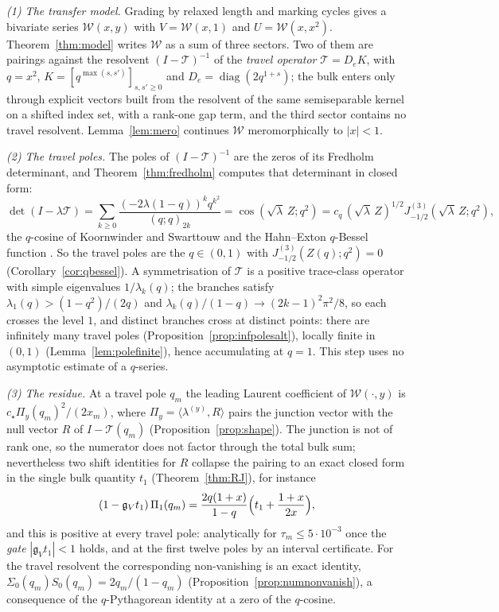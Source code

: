 \documentclass[11pt]{article}
\theoremstyle{plain}
\theoremstyle{definition}
\theoremstyle{remark}
\theoremstyle{plain}\newtheorem*{maintheorem}{Main Theorem}
\begin{document}
\emph{(1) The transfer model.} Grading by relaxed length and marking cycles gives a bivariate
series $\mathcal W(x,y)$ with $V=\mathcal W(x,1)$ and $U=\mathcal W(x,x^2)$. Theorem~\ref{thm:model}
writes $\mathcal W$ as a sum of three sectors. Two of them are pairings against the resolvent
$(I-\mathcal T)^{-1}$ of the \emph{travel operator} $\mathcal T=D_eK$, with $q=x^2$,
$K=[q^{\max(s,s')}]_{s,s'\ge0}$ and $D_e=\operatorname{diag}(2q^{1+s})$; the bulk enters only
through explicit vectors built from the resolvent of the same semiseparable kernel on a shifted
index set, with a rank-one gap term, and the third sector contains no travel resolvent.
Lemma~\ref{lem:mero} continues $\mathcal W$ meromorphically to $|x|<1$.

\emph{(2) The travel poles.} The poles of $(I-\mathcal T)^{-1}$ are the zeros of its Fredholm
determinant, and Theorem~\ref{thm:fredholm} computes that determinant in closed form:
\[
   \det(I-\lambda\mathcal T)=\sum_{k\ge0}\frac{(-2\lambda(1-q))^kq^{k^2}}{(q;q)_{2k}}
   =\cos(\sqrt\lambda\,Z;q^2)=c_q\,(\sqrt\lambda\,Z)^{1/2}J^{(3)}_{-1/2}(\sqrt\lambda\,Z;q^2),
\]
the $q$-cosine of Koornwinder and Swarttouw \cite{KS1992} and the Hahn--Exton $q$-Bessel
function \cite{Hahn1953,Exton1978,KoelinkSwarttouw1994}. So the travel poles are the $q\in(0,1)$
with $J^{(3)}_{-1/2}(Z(q);q^2)=0$ (Corollary~\ref{cor:qbessel}). A symmetrisation of $\mathcal T$ is
a positive trace-class operator with simple eigenvalues $1/\lambda_k(q)$; the branches satisfy
$\lambda_1(q)>(1-q^2)/(2q)$ and $\lambda_k(q)/(1-q)\to(2k-1)^2\pi^2/8$, so each crosses the level
$1$, and distinct branches cross at distinct points: there are infinitely many travel poles
(Proposition~\ref{prop:infpolesalt}), locally finite in $(0,1)$ (Lemma~\ref{lem:polefinite}), hence
accumulating at $q=1$. This step uses no asymptotic estimate of a $q$-series.

\emph{(3) The residue.} At a travel pole $q_m$ the leading Laurent coefficient of
$\mathcal W(\cdot,y)$ is $c_\star\Pi_y(q_m)^2/(2x_m)$, where $\Pi_y=\langle\lambda^{(y)},R\rangle$
pairs the junction vector with the null vector $R$ of $I-\mathcal T(q_m)$
(Proposition~\ref{prop:shape}). The junction is not of rank one, so the numerator does not factor
through the total bulk sum; nevertheless two shift identities for $R$ collapse the pairing to an
exact closed form in the single bulk quantity $t_1$ (Theorem~\ref{thm:RJ}), for instance
\[
   (1-\mathfrak g_Vt_1)\,\Pi_1(q_m)=\frac{2q(1+x)}{1-q}\Bigl(t_1+\frac{1+x}{2x}\Bigr),
\]
and this is positive at every travel pole: analytically for $\tau_m\le5\cdot10^{-3}$ once the
\emph{gate} $|\mathfrak g_Vt_1|<1$ holds, and at the first twelve poles by an interval certificate.
For the travel resolvent the corresponding non-vanishing is an exact identity,
$\Sigma_0(q_m)S_0(q_m)=2q_m/(1-q_m)$ (Proposition~\ref{prop:numnonvanish}), a consequence of the
$q$-Pythagorean identity at a zero of the $q$-cosine.
\end{document}
